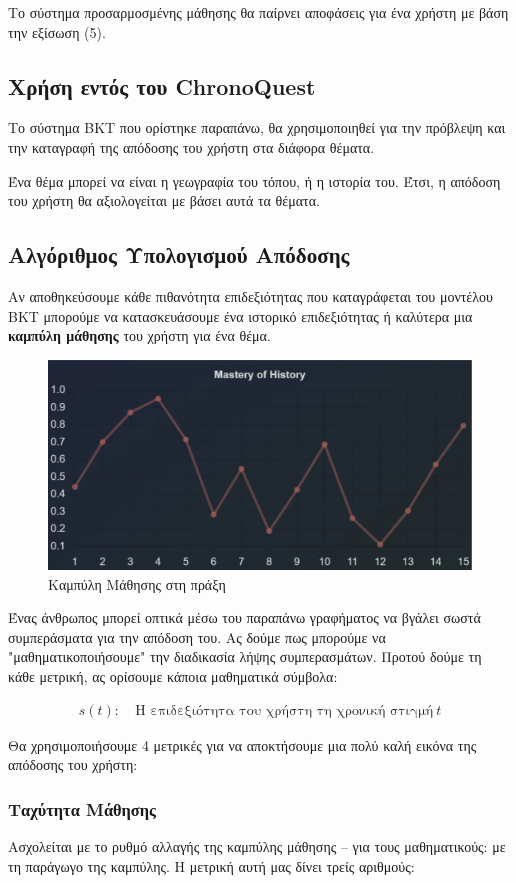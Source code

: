 Το σύστημα προσαρμοσμένης μάθησης θα παίρνει αποφάσεις για ένα χρήστη με βάση την εξίσωση (5).

\subsection{Χρήση εντός του \textlatin{ChronoQuest}}

Το σύστημα \textlatin{BKT} που ορίστηκε παραπάνω, θα χρησιμοποιηθεί για την πρόβλεψη και την καταγραφή της απόδοσης του χρήστη στα διάφορα θέματα.

Ένα θέμα μπορεί να είναι η γεωγραφία του τόπου, ή η ιστορία του. Έτσι, η απόδοση του χρήστη θα αξιολογείται με βάσει αυτά τα θέματα. 

\subsection{Αλγόριθμος Υπολογισμού Απόδοσης}
Αν αποθηκεύσουμε κάθε πιθανότητα επιδεξιότητας που καταγράφεται του μοντέλου \textlatin{BKT} μπορούμε να κατασκευάσουμε ένα ιστορικό επιδεξιότητας ή καλύτερα μια \textbf{καμπύλη μάθησης} του χρήστη για ένα θέμα.

\begin{figure}[H]
    \centering
    \includegraphics[width=0.5\linewidth]{img/MasteryGraph.png}
    \caption{Καμπύλη Μάθησης στη πράξη}
\end{figure}

Ένας άνθρωπος μπορεί οπτικά μέσω του παραπάνω γραφήματος να βγάλει σωστά συμπεράσματα για την απόδοση του. Ας δούμε πως μπορούμε να "μαθηματικοποιήσουμε" την διαδικασία λήψης συμπερασμάτων. Προτού δούμε τη κάθε μετρική, ας ορίσουμε κάποια μαθηματικά σύμβολα:

\begin{align*}
    s(t):\ &\text{Η επιδεξιότητα του χρήστη τη χρονική στιγμή}\ t  
\end{align*}

Θα χρησιμοποιήσουμε 4 μετρικές για να αποκτήσουμε μια πολύ καλή εικόνα της απόδοσης του χρήστη:
\subsubsection{Ταχύτητα Μάθησης}
Ασχολείται με το ρυθμό αλλαγής της καμπύλης μάθησης -- για τους μαθηματικούς: με τη παράγωγο της καμπύλης. Η μετρική αυτή μας δίνει τρείς αριθμούς:

